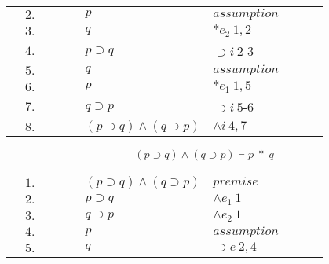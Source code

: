 \documentclass[11pt,a4paper]{article}
\begin{document}
\begin{itemize}
\begin{table}[H]
\begin{tabular}{*{10}{l}}
			& $2.$ & \multicolumn{1}{|c}{} & &  & $p$ & $assumption$ & & &\multicolumn{1}{c|}{}\\
			
			& $3.$ & \multicolumn{1}{|c}{} & &  & $q$ & $*e_2 \ 1, 2$ & & &\multicolumn{1}{c|}{}\\
			
			\cline{3-10}
			
			& $4.$ & & & & $p \supset q$ & $\supset i \ 2$-$3$ & & & \\
			
			\cline{3-10}
			
			& $5.$ & \multicolumn{1}{|c}{} & &  & $q$ & $assumption$ & & &\multicolumn{1}{c|}{}\\
			
			& $6.$ & \multicolumn{1}{|c}{} & &  & $p$ & $*e_1 \ 1, 5$ & & &\multicolumn{1}{c|}{}\\
			
			\cline{3-10}
			
			& $7.$ & & & & $q \supset p$ & $\supset i \ 5$-$6$ & & & \\
			
			& $8.$ & & & & $(p \supset q) \land (q \supset p)$ & $\land i \ 4, 7$ & & & \\
			
		\end{tabular}
		\end{table}
		
		
$$(p \supset q) \wedge (q \supset p) \vdash p\;*\;q$$

		\begin{table}[H]
		\centering
		\begin{tabular}{*{10}{l}}
			
			& $1.$ & & & & $(p \supset q) \land (q \supset p)$ & $premise$ & & &\\
			
			& $2.$ & & &  & $p \supset q$ & $\land e_1 \ 1$ & & &\\
			
			& $3.$ & & &  & $q \supset p$ & $\land e_2 \ 1$ & & &\\
			
			\cline{3-10}
			
			& $4.$ & \multicolumn{1}{|c}{} & &  & $p$ & $assumption$ & & &\multicolumn{1}{c|}{}\\
			
			& $5.$ & \multicolumn{1}{|c}{} & &  & $q$ & $\supset e \ 2, 4$ & & &\multicolumn{1}{c|}{}\\
			

\end{tabular}
\end{table}
\end{itemize}
\end{document}
